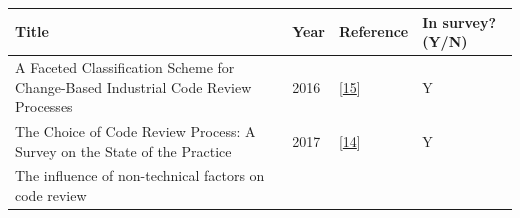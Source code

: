 \documentclass[]{book}
\begin{document}
\begin{longtable}[]{@{}llll@{}}
\toprule
\begin{minipage}[b]{0.56\columnwidth}\raggedright\strut
Title\strut
\end{minipage} & \begin{minipage}[b]{0.04\columnwidth}\raggedright\strut
Year\strut
\end{minipage} & \begin{minipage}[b]{0.16\columnwidth}\raggedright\strut
Reference\strut
\end{minipage} & \begin{minipage}[b]{0.12\columnwidth}\raggedright\strut
In survey? (Y/N)\strut
\end{minipage}\tabularnewline
\midrule
\endhead
\begin{minipage}[t]{0.56\columnwidth}\raggedright\strut
A Faceted Classification Scheme for Change-Based Industrial Code Review
Processes\strut
\end{minipage} & \begin{minipage}[t]{0.04\columnwidth}\raggedright\strut
2016\strut
\end{minipage} & \begin{minipage}[t]{0.16\columnwidth}\raggedright\strut
{[}\protect\hyperlink{ref-baum2016faceted}{15}{]}\strut
\end{minipage} & \begin{minipage}[t]{0.12\columnwidth}\raggedright\strut
Y\strut
\end{minipage}\tabularnewline
\begin{minipage}[t]{0.56\columnwidth}\raggedright\strut
The Choice of Code Review Process: A Survey on the State of the
Practice\strut
\end{minipage} & \begin{minipage}[t]{0.04\columnwidth}\raggedright\strut
2017\strut
\end{minipage} & \begin{minipage}[t]{0.16\columnwidth}\raggedright\strut
{[}\protect\hyperlink{ref-baum2017choice}{14}{]}\strut
\end{minipage} & \begin{minipage}[t]{0.12\columnwidth}\raggedright\strut
Y\strut
\end{minipage}\tabularnewline
\begin{minipage}[t]{0.56\columnwidth}\raggedright\strut
The influence of non-technical factors on code review\strut
\end{minipage} & \begin{minipage}[t]{0.04\columnwidth}\raggedright\strut

\end{minipage}
\end{longtable}
\end{document}
